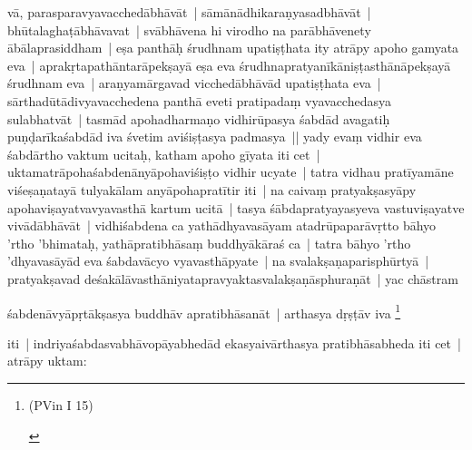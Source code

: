 \documentclass[article,a4paper]{memoir}
\begin{document}
vā\-, parasparavyavacchedā\-bhā\-vā\-t | sā\-mā\-nā\-dhikaraṇyasadbhā\-vā\-t | bhū\-talaghaṭā\-bhā\-vavat | svā\-bhā\-vena hi virodho na parā\-bhā\-venety ā\-bā\-laprasiddham | eṣa panthā\-ḥ śrudhnam upatiṣṭhata ity atrā\-py apoho gamyata eva | aprakṛtapathā\-ntarā\-pekṣayā\- eṣa eva śrudhnapratyanī\-kā\-niṣṭasthā\-nā\-pekṣayā\- śrudhnam eva | araṇyamā\-rgavad vicchedā\-bhā\-vā\-d upatiṣṭhata eva | sā\-rthadū\-tā\-divyavacchedena panthā\- eveti pratipadaṃ vyavacchedasya sulabhatvā\-t | tasmā\-d apohadharmaṇo vidhirū\-pasya śabdā\-d avagatiḥ puṇḍarī\-kaśabdā\-d iva śvetim aviśiṣṭasya padmasya || \label{thakur75-60.16} yady evaṃ vidhir eva śabdā\-rtho vaktum ucitaḥ, katham apoho gī\-yata iti cet | uktamatrā\-pohaśabdenā\-nyā\-pohaviśiṣṭo vidhir ucyate | tatra vidhau pratī\-yamā\-ne viśeṣaṇatayā\- tulyakā\-lam anyā\-pohapratī\-tir iti | \label{thakur75-60.19} na caivaṃ pratyakṣasyā\-py apohaviṣayatvavyavasthā\- kartum ucitā\- | tasya śā\-bdapratyayasyeva vastuviṣayatve vivā\-dā\-bhā\-vā\-t | vidhiśabdena ca yathā\-dhyavasā\-yam atadrū\-paparā\-vṛtto bā\-hyo 'rtho 'bhimataḥ, yathā\-pratibhā\-saṃ buddhyā\-kā\-raś ca | tatra bā\-hyo 'rtho 'dhyavasā\-yā\-d eva śabdavā\-cyo vyavasthā\-pyate | na svalakṣaṇaparisphū\-rtyā\- | pratyakṣavad deśakā\-lā\-vasthā\-niyatapravyaktasvalakṣaṇā\-sphuraṇā\-t | yac chā\-stram
	\pend
      

	  \pstart śabdenā\-vyā\-pṛtā\-kṣasya buddhā\-v apratibhā\-sanā\-t | arthasya dṛṣṭā\-v iva \footnote{\begin{english}(PVin I 15)\end{english}}
	\pend
      

	  \pstart iti | indriyaśabdasvabhā\-vopā\-yabhedā\-d ekasyaivā\-rthasya pratibhā\-sabheda iti cet | atrā\-py uktam:
	\pend
      
\end{document}
